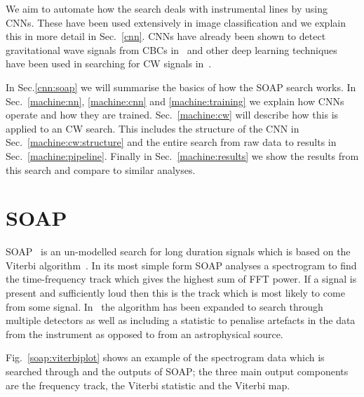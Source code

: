 %

We aim to automate how the search deals with instrumental lines by using \acp{CNN}.
These have been used extensively in image classification and we explain this in
more detail in Sec.~\ref{cnn}. \acp{CNN}
have already been shown to detect gravitational wave signals from \acp{CBC}
in~\cite{gabbard2018MatchingMatched,george2018DeepLearning,gebhard2019ConvolutionalNeural}
and other deep learning techniques have been used in searching for \ac{CW}
signals in~\cite{dreissigacker2019DeeplearningContinuous}. 

%
In Sec.\ref{cnn:soap} we will summarise the basics of how the SOAP search works. In
Sec.~\ref{machine:nn}, \ref{machine:cnn} and \ref{machine:training} we explain how \acp{CNN} operate and how they are trained. Sec.~\ref{machine:cw} will describe how this is applied to an \ac{CW} search. 
This includes the structure of the \ac{CNN} in Sec.~\ref{machine:cw:structure} and the entire search from raw data to results in Sec.~\ref{machine:pipeline}. Finally in Sec.~\ref{machine:results} we
show the results from this search and compare to similar analyses. 

\section{\label{cnn:soap} SOAP}

%
SOAP~\cite{bayley2019SOAPGeneralised} is an un-modelled search for long
duration signals which is based on the Viterbi
algorithm~\cite{viterbi1967ErrorBounds}. In its most simple form SOAP
analyses a spectrogram to find the time-frequency track which gives the highest
sum of \ac{FFT} power. If a signal is present and sufficiently loud then this
is the track which is most likely to come from some signal.
In~\cite{bayley2019SOAPGeneralised} the algorithm has been expanded to
search through multiple detectors as well as including a statistic to penalise
artefacts in the data from the instrument as opposed to from an astrophysical
source. 

%
Fig.~\ref{soap:viterbiplot} shows an example of the spectrogram data which is
searched through and the outputs of SOAP; the three main output components are
the frequency track, the Viterbi statistic and the Viterbi map.

